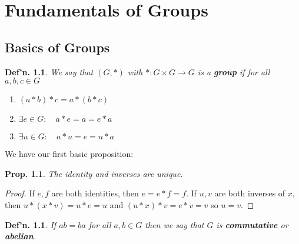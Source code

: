 \documentclass[12pt, a4paper]{book}
\newtheorem{definition}[theorem]{Def'n.}
\newtheorem{proposition}[theorem]{Prop.}
\theoremstyle{nonumberplain}
\newtheorem{proof}{Proof}
\begin{document}
\chapter{Fundamentals of Groups}
\section{Basics of Groups}
\begin{definition}
    We say that $(G,*)$ with $*:G\times G\to G$ is a \textbf{group} if for all $a,b,c\in G$
    \begin{enumerate}
        \item $(a*b)*c=a*(b*c)$
        \item $\exists e\in G:\quad a*e=a=e*a$
        \item $\exists u\in G:\quad a*u=e=u*a$
    \end{enumerate}
\end{definition}
We have our first basic proposition:
\begin{proposition}
    The identity and inverses are unique.
\end{proposition}
\begin{proof}
    If $e,f$ are both identities, then $e=e*f=f$.
    If $u,v$ are both inverses of $x$, then $u*(x*v)=u*e=u$ and $(u*x)*v=e*v=v$ so $u=v$.
\end{proof}
\begin{definition}
    If $ab=ba$ for all $a,b\in G$ then we say that $G$ is \textbf{commutative} or \textbf{abelian}.
\end{definition}
\end{document}
